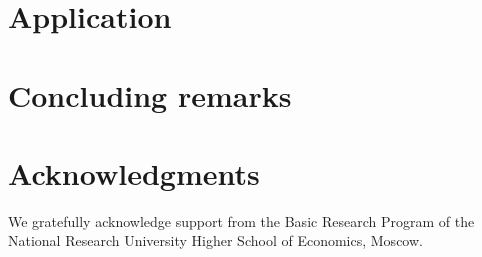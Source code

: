 \documentclass[letterpaper,fleqn,12pt]{article}
\begin{document}
\begin{onehalfspace}%

\section{Application}

\section{\noindent \noindent Concluding remarks}

\section{Acknowledgments}

We gratefully acknowledge support from the Basic Research Program of the
National Research University Higher School of Economics, Moscow.

\end{onehalfspace}%

\noindent
\end{document}
